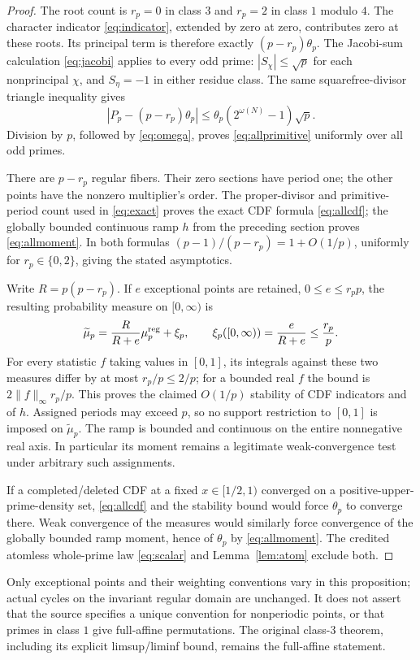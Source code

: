 \documentclass[11pt]{article}
\theoremstyle{remark}
\begin{document}
\begin{proof}
The root count is $r_p=0$ in class $3$ and $r_p=2$ in class $1$ modulo $4$.
The character indicator \eqref{eq:indicator}, extended by zero at zero,
contributes zero at these roots. Its principal term is therefore exactly
$(p-r_p)\theta_p$. The Jacobi-sum calculation \eqref{eq:jacobi} applies
to every odd prime: $|S_\chi|\le\sqrt p$ for each nonprincipal $\chi$,
and $S_\eta=-1$ in either residue class. The same squarefree-divisor
triangle inequality gives
\[
 |P_p-(p-r_p)\theta_p|
 \le\theta_p(2^{\omega(N)}-1)\sqrt p.
\]
Division by $p$, followed by \eqref{eq:omega}, proves
\eqref{eq:allprimitive} uniformly over all odd primes.

There are $p-r_p$ regular fibers. Their zero sections have period one;
the other points have the nonzero multiplier's order. The proper-divisor
and primitive-period count used in \eqref{eq:exact} proves the exact
CDF formula \eqref{eq:allcdf}; the globally bounded continuous ramp $h$
from the preceding section proves \eqref{eq:allmoment}. In both formulas
$(p-1)/(p-r_p)=1+O(1/p)$, uniformly for $r_p\in\{0,2\}$, giving the stated
asymptotics.

Write $R=p(p-r_p)$. If $e$ exceptional points are retained, $0\le e\le r_p p$,
the resulting probability measure on $[0,\infty)$ is
\[
 \widetilde\mu_p=\frac{R}{R+e}\mu_p^{\rm reg}+\xi_p,
 \qquad \xi_p([0,\infty))=\frac{e}{R+e}\le\frac{r_p}{p}.
\]
For every statistic $f$ taking values in $[0,1]$, its integrals against
these two measures differ by at most $r_p/p\le2/p$; for a bounded
real $f$ the bound is $2\|f\|_\infty r_p/p$. This proves the claimed
$O(1/p)$ stability of CDF indicators and of $h$. Assigned periods may
exceed $p$, so no support restriction to $[0,1]$ is imposed on
$\widetilde\mu_p$. The ramp is bounded and continuous on the entire
nonnegative real axis. In particular its moment remains a legitimate
weak-convergence test under arbitrary such assignments.

If a completed/deleted CDF at a fixed $x\in[1/2,1)$ converged on a
positive-upper-prime-density set, \eqref{eq:allcdf} and the stability
bound would force $\theta_p$ to converge there. Weak convergence of the
measures would similarly force convergence of the globally bounded ramp
moment, hence of $\theta_p$ by \eqref{eq:allmoment}. The credited atomless
whole-prime law \eqref{eq:scalar} and Lemma~\ref{lem:atom} exclude both.
\end{proof}

Only exceptional points and their weighting conventions vary in this
proposition; actual cycles on the invariant regular domain are unchanged.
It does not assert that the source specifies a unique convention for
nonperiodic points, or that primes in class $1$ give full-affine
permutations. The original class-$3$ theorem, including its explicit
limsup/liminf bound, remains the full-affine statement.
\end{document}
